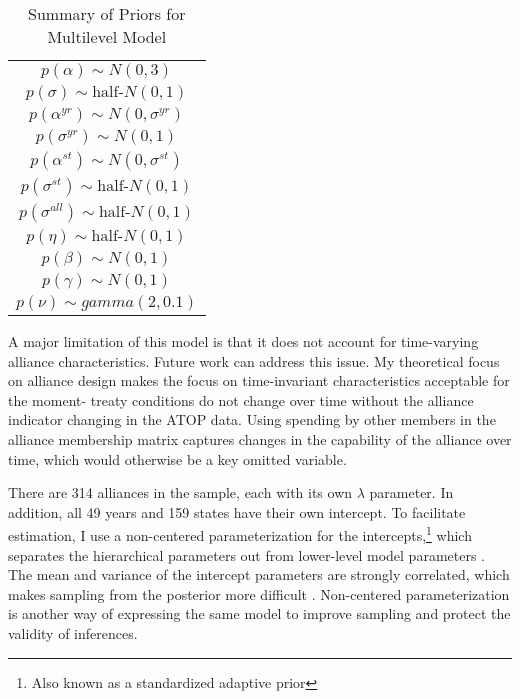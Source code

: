 \documentclass[12pt]{article}
\begin{document}
\begin{table} %

 \begin{center}
\begin{tabular}{c} 
$ p(\alpha) \sim N(0, 3)$  \\
$ p(\sigma) \sim \mbox{half-}N(0, 1) $ \\
$ p(\alpha^{yr}) \sim N(0, \sigma^{yr}) $ \\ 
$ p(\sigma^{yr}) \sim N(0, 1) $ \\
$ p(\alpha^{st}) \sim N(0, \sigma^{st}) $ \\ 
$ p(\sigma^{st}) \sim \mbox{half-}N(0, 1) $ \\ 
$ p(\sigma^{all}) \sim \mbox{half-}N(0, 1) $ \\
$ p(\eta) \sim \mbox{half-}N(0, 1) $ \\
$ p(\beta) \sim N(0, 1) $ \\
$ p(\gamma) \sim N(0, 1) $ \\ 
$ p(\nu) \sim gamma(2, 0.1)$ 
\end{tabular} 
\end{center} 

\caption{Summary of Priors for Multilevel Model}
\label{tab:priors}
\end{table} 

A major limitation of this model is that it does not account for time-varying alliance characteristics. Future work can address this issue. My theoretical focus on alliance design makes the focus on time-invariant characteristics acceptable for the moment- treaty conditions do not change over time without the alliance indicator changing in the ATOP data. Using spending by other members in the alliance membership matrix captures changes in the capability of the alliance over time, which would otherwise be a key omitted variable. 

There are 314 alliances in the sample, each with its own $\lambda$ parameter. In addition, all 49 years and 159 states have their own intercept. To facilitate estimation, I use a non-centered parameterization for the intercepts,\footnote{Also known as a standardized adaptive prior} which separates the hierarchical parameters out from lower-level model parameters \citep{McElreath2016}. The mean and variance of the intercept parameters are strongly correlated, which makes sampling from the posterior more difficult \citep{BetancourtGirolani2015}. Non-centered parameterization is another way of expressing the same model to improve sampling and protect the validity of inferences. 
\end{document}
